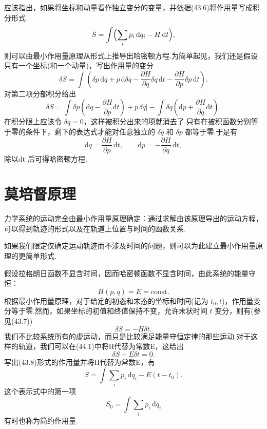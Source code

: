 应该指出，如果将坐标和动量看作独立变分的变量，并依据(43.6)将作用量写成积分形式
\begin{equation}
  S=\int\Bigl(\sum_i p_i\,\mathrm{d}q_i-H\,\mathrm{d}t\Bigr),
\end{equation}
则可以由最小作用量原理从形式上推导出哈密顿方程.为简单起见，我们还是假设只有一个坐标(和一个动量)，写出作用量的变分
\begin{equation*}
  \delta S=\int\left(\delta p\,\mathrm{d}q+p\,\mathrm{d}\delta q
  -\frac{\partial H}{\partial q}\delta q\,\mathrm{d}t
  -\frac{\partial H}{\partial p}\delta p\,\mathrm{d}t\right).
\end{equation*}
对第二项分部积分给出
\begin{equation*}
  \delta S=\int\delta p\left(\mathrm{d}q-\frac{\partial H}{\partial p}\mathrm{d}t\right)
  +\left.p\,\delta q\right|
  -\int\delta q\left(\mathrm{d}p+\frac{\partial H}{\partial q}\mathrm{d}t\right).
\end{equation*}
在积分限上应该令 $\delta q=0$，这样被积分出来的项就消去了.只有在被积函数分别等于零的条件下，剩下的表达式才能对任意独立的
$\delta q$ 和 $\delta p$ 都等于零.于是有
\begin{equation*}
  \mathrm{d}q=\frac{\partial H}{\partial p}\,\mathrm{d}t,\qquad
  \mathrm{d}p=-\frac{\partial H}{\partial q}\,\mathrm{d}t,
\end{equation*}
除以dt 后可得哈密顿方程.

\section{莫培督原理}

力学系统的运动完全由最小作用量原理确定：通过求解由该原理导出的运动方程，可以得到轨迹的形式以及在轨道上位置与时间的函数关系.

如果我们限定仅确定运动轨迹而不涉及时间的问题，则可以为此建立最小作用量原理的更简单形式.

假设拉格朗日函数不显含时间，因而哈密顿函数不显含时间，由此系统的能量守恒：
\begin{equation*}
  H(p,q)=E=\mathrm{const}.
\end{equation*}
根据最小作用量原理，对于给定的初态和末态的坐标和时间(记为 $t_0,t$)，作用量变分等于零.然而，如果坐标的初值和终值保持不变，允许末状时间
$t$ 变分，则有(参见(43.7))
\begin{equation}
  \delta S=-H\delta t.
\end{equation}
我们不比较系统所有的虚运动，而只是比较满足能量守恒定律的那些运动.对于这样的轨道，我们可以在(44.1)中将H代替为常数E，这给出
\begin{equation}
  \delta S+E\delta t=0.
\end{equation}
写出(43.8)形式的作用量并将H代替为常数E，有
\begin{equation}
  S=\int\sum_i p_i\,\mathrm{d}q_i-E(t-t_0).
\end{equation}
这个表示式中的第一项
\begin{equation}
  S_0=\int\sum_i p_i\,\mathrm{d}q_i
\end{equation}
有时也称为简约作用量.

